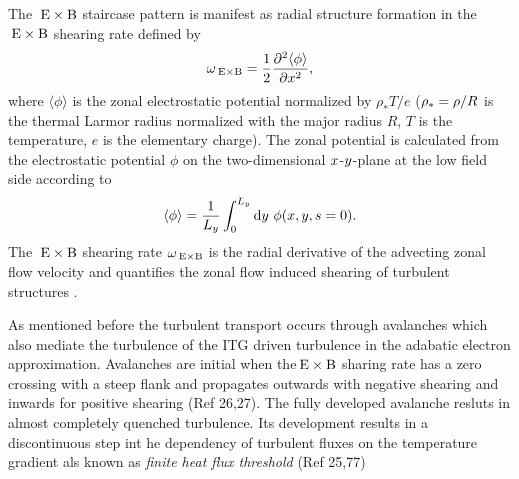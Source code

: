 The $\mathrm{\:E}\times\mathrm{B}$ staircase pattern is manifest as radial structure formation in the $\mathrm{\:E}\times\mathrm{B}$ shearing rate defined by\cite{rath2016, doi:10.1063/1.3005380, peeters2016}
\begin{equation}
	\omega_{\mathrm{\:E \times B}} = \frac{1}{2} \frac{\partial^2 \langle \phi \rangle}{\partial x^2},
	\label{eq:shearingrate}
\end{equation}
where $\langle \phi \rangle$ is the zonal electrostatic potential normalized by $\rho_\ast T/e$ ($\rho_\ast = \rho/R$ is the thermal Larmor radius normalized with the major radius $R$, $T$ is the temperature, $e$ is the elementary charge).
The zonal potential is calculated from the electrostatic potential $\phi$ on the two-dimensional $x$-$y$-plane at the low field side according to\cite{rath2021}
\begin{equation}
\langle \phi \rangle = \frac{1}{L_y} \int_0^{L_y} \mathrm{d}y ~ \phi(x,y,s=0).
\end{equation}
The $\mathrm{\:E}\times\mathrm{B}$ shearing rate $\omega_{\mathrm{\:E \times B}}$ is the radial derivative of the advecting zonal flow velocity \cite{doi:10.1063/1.871313, doi:10.1063/1.872847} and quantifies the zonal flow induced shearing of turbulent structures \cite{doi:10.1063/1.859529, doi:10.1063/1.871313, doi:10.1063/1.872367}. \\ \bigskip

As mentioned before the turbulent transport occurs through avalanches which also mediate the turbulence of the ITG driven turbulence in the adabatic electron approximation. Avalanches are initial when the$\mathrm{\:E}\times\mathrm{B}$ sharing rate has a zero crossing with a steep flank and propagates outwards with negative shearing and inwards for positive shearing (Ref 26,27). The fully developed avalanche resluts in almost completely quenched turbulence. Its development results in a discontinuous step int he dependency of turbulent fluxes on the temperature gradient als known as \textit{finite heat flux threshold} (Ref 25,77)